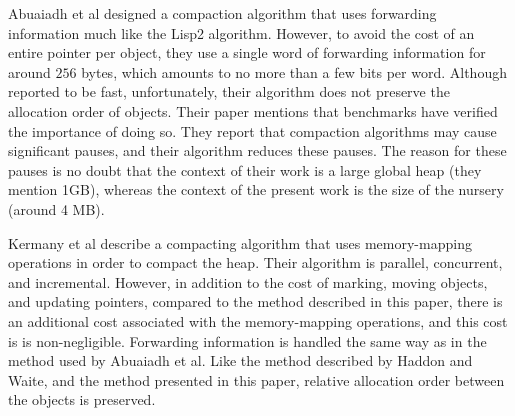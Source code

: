 Abuaiadh et al \cite{Abuaiadh:2004:EPH:1028976.1028995} designed a
compaction algorithm that uses forwarding information much like the
Lisp2 algorithm.  However, to avoid the cost of an entire pointer per
object, they use a single word of forwarding information for around
$256$ bytes, which amounts to no more than a few bits per word.
Although reported to be fast, unfortunately, their algorithm does not
preserve the allocation order of objects.  Their paper mentions that
benchmarks have verified the importance of doing so.  They report that
compaction algorithms may cause significant pauses, and their
algorithm reduces these pauses.  The reason for these pauses is no
doubt that the context of their work is a large global heap (they
mention 1GB), whereas the context of the present work is the size of
the nursery (around 4 MB).

Kermany et al \cite{Kermany:2006:CCI:1133981.1134023} describe a
compacting algorithm that uses memory-mapping operations in order to
compact the heap.  Their algorithm is parallel, concurrent, and
incremental.  However, in addition to the cost of marking, moving
objects, and updating pointers, compared to the method described in
this paper, there is an additional cost associated with the
memory-mapping operations, and this cost is is non-negligible.
Forwarding information is handled the same way as in the method used
by Abuaiadh et al.  Like the method described by Haddon and Waite, and
the method presented in this paper, relative allocation order between
the objects is preserved.
\vfill\eject
